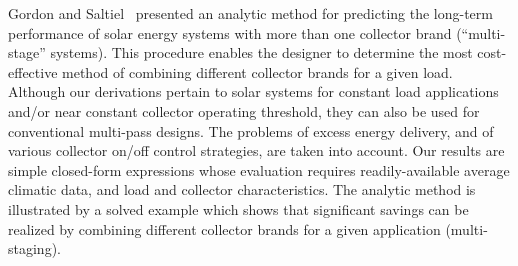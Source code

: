 Gordon and Saltiel~\cite{Gordon1986} presented an analytic method for predicting the long-term performance of solar energy systems with more than one collector brand (“multi-stage” systems). This procedure enables the designer to determine the most cost-effective method of combining different collector brands for a given load. Although our derivations pertain to solar systems for constant load applications and/or near constant collector operating threshold, they can also be used for conventional multi-pass designs. The problems of excess energy delivery, and of various collector on/off control strategies, are taken into account. Our results are simple closed-form expressions whose evaluation requires readily-available average climatic data, and load and collector characteristics. The analytic method is illustrated by a solved example which shows that significant savings can be realized by combining different collector brands for a given application (multi-staging).


